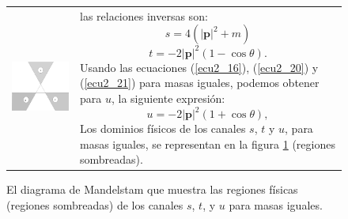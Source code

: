\begin{figure}[H]
\begin{tabular}{p{7.0cm}p{7.0cm}}
\begin{minipage}[l]{7.225cm}
\includegraphics[width=7.225cm]{Imagenes/figurastesis/canalesfisicos.pdf}
\caption{El diagrama de  Mandelstam que muestra las regiones f\'isicas (regiones sombreadas) de los canales $s$, $t$, y $u$ para masas iguales.}
\label{figregfiscas}
\end{minipage}
&
\begin{minipage}[r]{7.225cm}
las relaciones inversas son:
\begin{equation}\label{ecu2_20}
s=4(|\pmb{p}|^2+m)
\end{equation}
\begin{equation}
t=-2|\pmb{p}|^2(1-\cos\theta)\label{ecu2_21}.
\end{equation}
Usando las ecuaciones (\ref{ecu2_16}), (\ref{ecu2_20}) y (\ref{ecu2_21}) para masas iguales, podemos obtener para $u$, la siguiente expresi\'on:
\begin{equation}
u=-2|\pmb{p}|^2(1+\cos\theta),
\end{equation}
Los dominios f\'isicos  de los canales $s$, $t$ y $u$, para masas iguales, se representan en la figura \ref{figregfiscas} (regiones sombreadas). 
\end{minipage}
\end{tabular}
\end{figure}
